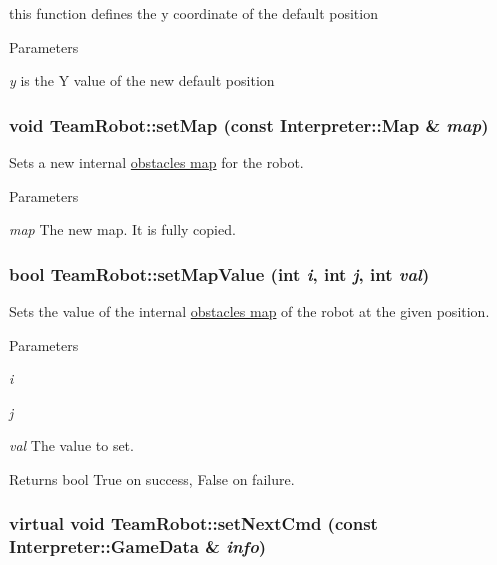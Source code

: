 this function defines the y coordinate of the default position 


\begin{DoxyParams}{Parameters}
\item[{\em y}]is the Y value of the new default position \end{DoxyParams}
\hypertarget{classTeamRobot_ab8c92b6228aed8eef31d0b1b0fce8690}{
\subsubsection[{setMap}]{\setlength{\rightskip}{0pt plus 5cm}void TeamRobot::setMap (const {\bf Interpreter::Map} \& {\em map})}}
\label{classTeamRobot_ab8c92b6228aed8eef31d0b1b0fce8690}


Sets a new internal \hyperlink{classInterpreter_a4c080f069f557cf92dfe803117a6ea53}{obstacles map} for the robot. 


\begin{DoxyParams}{Parameters}
\item[{\em map}]The new map. It is fully copied. \end{DoxyParams}
\hypertarget{classTeamRobot_a28ee2460e7d465989bb0582782db851e}{
\subsubsection[{setMapValue}]{\setlength{\rightskip}{0pt plus 5cm}bool TeamRobot::setMapValue (int {\em i}, \/  int {\em j}, \/  int {\em val})}}
\label{classTeamRobot_a28ee2460e7d465989bb0582782db851e}


Sets the value of the internal \hyperlink{classInterpreter_a4c080f069f557cf92dfe803117a6ea53}{obstacles map} of the robot at the given position. 


\begin{DoxyParams}{Parameters}
\item[{\em i}]\item[{\em j}]\item[{\em val}]The value to set. \end{DoxyParams}
\begin{DoxyReturn}{Returns}
bool True on success, False on failure. 
\end{DoxyReturn}
\hypertarget{classTeamRobot_a65f9a2b7464dfac3f4a0336810cf574f}{
\subsubsection[{setNextCmd}]{\setlength{\rightskip}{0pt plus 5cm}virtual void TeamRobot::setNextCmd (const {\bf Interpreter::GameData} \& {\em info})}}
\label{classTeamRobot_a65f9a2b7464dfac3f4a0336810cf574f}


